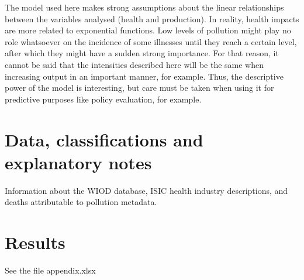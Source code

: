 \documentclass[a4paper,12pt, ]{article}
\begin{document}
The model used here makes strong assumptions about the linear relationships between the variables analysed (health and production). In reality, health impacts are more related to exponential functions. Low levels of pollution might play no role whatsoever on the incidence of some illnesses until they reach a certain level, after which they might have a sudden strong importance. For that reason, it cannot be said that the intensities described here will be the same when increasing output in an important manner, for example. Thus, the descriptive power of the model is interesting, but care must be taken when using it for predictive purposes like policy evaluation, for example.




\newpage 





\appendix

\newpage 
\section{Data, classifications and explanatory notes} 
\label{appendix:classif}

Information about the WIOD database, ISIC health industry descriptions, and deaths attributable to pollution metadata.

\section{Results}
\label{appendix:results}

See the file appendix.xlsx


\end{document}

